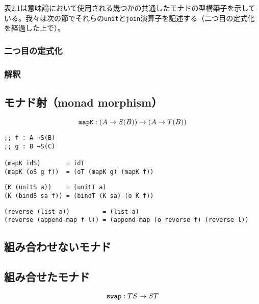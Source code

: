 \documentclass[11pt, oneside]{jsarticle}   	%
\begin{document}
表2.1は意味論において使用される幾つかの共通したモナドの型構築子を示している。我々は次の節でそれらの\verb|unit|と\verb|join|演算子を記述する（二つ目の定式化を経過した上で）。
\subsubsection{ 二つ目の定式化 }
\subsubsection{ 解釈 }

\newpage

\newpage

\newpage

\subsection{ モナド射（monad morphism） }
$$
\verb|mapK| : (A \rightarrow S(B)) \rightarrow (A \rightarrow T(B))
$$
\begin{lstlisting}
;; f : A →S(B)
;; g : B →S(C)

(mapK idS)       = idT   
(mapK (oS g f))  = (oT (mapK g) (mapK f))
\end{lstlisting}

\begin{lstlisting}
(K (unitS a))    = (unitT a)
(K (bindS sa f)) = (bindT (K sa) (o K f))
\end{lstlisting}

\begin{lstlisting}
(reverse (list a))         = (list a)
(reverse (append-map f l)) = (append-map (o reverse f) (reverse l))
\end{lstlisting}

\subsection{ 組み合わせないモナド }

\newpage


\subsection{ 組み合せたモナド }
$$
\verb|swap| : TS \rightarrow ST
$$
\end{document}
